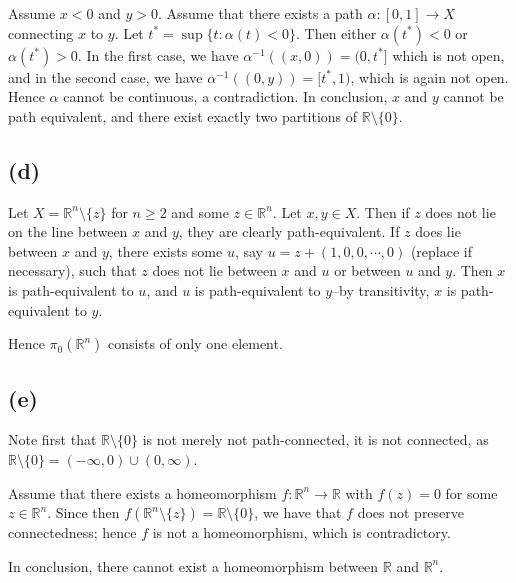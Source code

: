 \documentclass[11pt]{amsart}
\theoremstyle{definition}
\newcommand{\R}{\mathbb{R}}
\numberwithin{equation}{section}
\begin{document}
Assume $x < 0$ and $y > 0$. Assume that there exists a path $\alpha: [0,1] \to X$ connecting $x$ to $y$.
Let $t^* = \sup\{t: \alpha(t) < 0\}$. Then either $\alpha(t^*) < 0$ or $\alpha(t^*) > 0$. In the first case, we have $\alpha^{-1}((x,0)) = (0, t^*]$ which is not open, and in the second case,
we have
$\alpha^{-1}((0,y)) = [t^*, 1)$, which is again not open. Hence $\alpha$ cannot be continuous, a contradiction. In conclusion, $x$ and $y$ cannot be path equivalent, and there exist exactly two partitions of $\R \setminus \{0\}$.

\subsection*{(d)}
Let $X = \R^n \setminus \{z\}$ for $n \geq 2$ and some $z\in \R^n$. Let $x,y \in X$. Then if $z$ does not lie on the line between $x$ and $y$, they are clearly path-equivalent. If $z$ does lie between $x$ and $y$, there exists some $u$, say $u = z + (1,0,0,\cdots,0)$ (replace if necessary), such that $z$ does not lie between $x$ and $u$ or between $u$ and $y$. Then $x$ is path-equivalent to $u$, and $u$ is path-equivalent to $y$--by transitivity, $x$ is path-equivalent to $y$.

Hence $\pi_0(\R^n)$ consists of only one element.

\subsection*{(e)}
Note first that $\R \setminus \{0\}$ is not merely not path-connected, it is not connected, as $\R \setminus \{0\} = (-\infty,0) \cup (0,\infty)$.

Assume that there exists a homeomorphism $f: \R^n \to \R$ with $f(z) = 0$ for some $z\in\R^n$. Since then $f(\R^n \setminus \{z\}) = \R \setminus \{0\}$, we have that $f$ does not preserve connectedness; hence $f$ is not a homeomorphism, which is contradictory.

In conclusion, there cannot exist a homeomorphism between $\R$ and $\R^n$.
\end{document}
